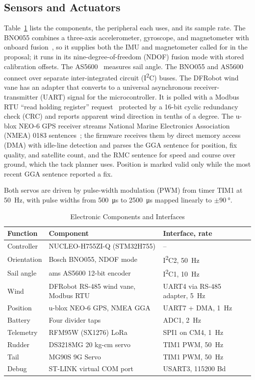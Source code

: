\subsection{Sensors and Actuators}
Table~\ref{tab:elec} lists the components, the peripheral each uses, and its
sample rate. The BNO055 combines a three-axis accelerometer, gyroscope, and
magnetometer with onboard fusion~\cite{bno055}, so it supplies both the
IMU and magnetometer called for in the proposal;
it runs in its nine-degree-of-freedom (NDOF) fusion mode with stored
calibration offsets. The AS5600~\cite{as5600} measures sail angle. The BNO055 and AS5600 connect over separate inter-integrated circuit (I\textsuperscript{2}C) buses. The DFRobot wind
vane has an adapter that converts to a universal asynchronous receiver-transmitter (UART) signal for
the microcontroller. It is polled with a Modbus RTU ``read holding register''
request~\cite{modbus} protected by a 16-bit cyclic redundancy check (CRC) and reports apparent wind
direction in tenths of a degree. The u-blox NEO-6 GPS receiver streams National Marine Electronics Association (NMEA) 0183
sentences~\cite{nmea0183}; the firmware receives them by direct memory access
(DMA) with idle-line detection and parses the GGA sentence for position, fix
quality, and satellite count, and the RMC sentence for speed and course over
ground, which the tack planner uses. Position is marked valid only while the
most recent GGA sentence reported a fix.

Both servos are driven by pulse-width modulation (PWM) from timer TIM1 at \SI{50}{\hertz}, with pulse widths
from \SI{500}{\micro\second} to \SI{2500}{\micro\second} mapped linearly to
$\pm\SI{90}{\degree}$.

\begin{table}[!t]
\caption{Electronic Components and Interfaces}
\label{tab:elec}
\centering
\begin{tabular}{@{}p{}p{}p{}@{}}
\toprule
Function & Component & Interface, rate \\
\midrule
Controller   & NUCLEO-H755ZI-Q (STM32H755) & -- \\
Orientation  & Bosch BNO055, NDOF mode & I\textsuperscript{2}C2, \SI{50}{\hertz} \\
Sail angle   & ams AS5600 12-bit encoder & I\textsuperscript{2}C1, \SI{10}{\hertz} \\
Wind         & DFRobot RS-485 wind vane, Modbus RTU & UART4 via RS-485 adapter, \SI{5}{\hertz} \\
Position     & u-blox NEO-6 GPS, NMEA GGA & UART7 + DMA, \SI{1}{\hertz} \\
Battery      & Four divider taps & ADC1, \SI{2}{\hertz} \\
Telemetry    & RFM95W (SX1276) LoRa & SPI1 on CM4, \SI{1}{\hertz} \\
Rudder       & DS3218MG 20 kg-cm servo & TIM1 PWM, \SI{50}{\hertz} \\
Tail         & MG90S 9G Servo & TIM1 PWM, \SI{50}{\hertz} \\
Debug        & ST-LINK virtual COM port & USART3, 115200 Bd \\
\bottomrule
\end{tabular}
\end{table}


